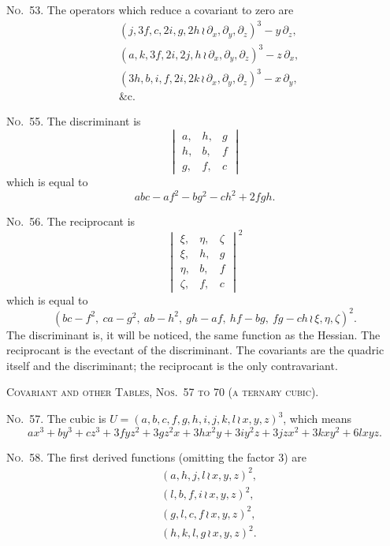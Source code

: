 \documentclass[11pt,a4paper]{article}
\begin{document}
\noindent\textsc{No.~53.} The operators which reduce a covariant to zero are
\begin{align*}
&(j, 3f, c, 2i, g, 2h \, \wr\, \partial_x, \partial_y, \partial_z)^3 - y\,\partial_z,\\
&(a, k, 3f, 2i, 2j, h \, \wr\, \partial_x, \partial_y, \partial_z)^3 - z\,\partial_x,\\
&(3h, b, i, f, 2i, 2k \, \wr\, \partial_x, \partial_y, \partial_z)^3 - x\,\partial_y,\\
&\text{\&c.}
\end{align*}

\noindent\textsc{No.~55.} The discriminant is
\[
\begin{vmatrix}
a, & h, & g \\
h, & b, & f \\
g, & f, & c
\end{vmatrix}
\]
which is equal to
\[abc - af^2 - bg^2 - ch^2 + 2fgh.\]

\noindent\textsc{No.~56.} The reciprocant is
\[
\begin{vmatrix}
\xi, & \eta, & \zeta \\
\xi, & h, & g \\
\eta, & b, & f \\
\zeta, & f, & c
\end{vmatrix}^2
\]
which is equal to
\[(bc-f^2,\ ca-g^2,\ ab-h^2,\ gh-af,\ hf-bg,\ fg-ch \, \wr\, \xi, \eta, \zeta)^2.\]
The discriminant is, it will be noticed, the same function as the Hessian.
The reciprocant is the evectant of the discriminant.
The covariants are the quadric itself and the discriminant; the reciprocant is the only contravariant.

\clearpage
\noindent\textsc{Covariant and other Tables, Nos.~57 to 70 (a ternary cubic).}

\noindent\textsc{No.~57.} The cubic is $U = (a, b, c, f, g, h, i, j, k, l \, \wr\, x, y, z)^3$,
which means
\[ax^3 + by^3 + cz^3 + 3fyz^2 + 3gz^2x + 3hx^2y + 3iy^2z + 3jzx^2 + 3kxy^2 + 6lxyz.\]

\noindent\textsc{No.~58.} The first derived functions (omitting the factor 3) are
\begin{align*}
&(a, h, j, l \, \wr\, x, y, z)^2,\\
&(l, b, f, i \, \wr\, x, y, z)^2,\\
&(g, l, c, f \, \wr\, x, y, z)^2,\\
&(h, k, l, g \, \wr\, x, y, z)^2.
\end{align*}
\end{document}
